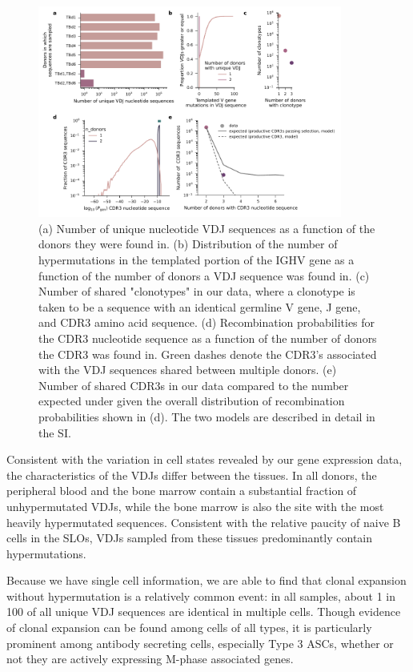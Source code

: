 \begin{figure}
    \centering
    \includegraphics[width=10cm]{figs/Tabula_Bursa/ED_donor_sharing.pdf}
    \caption[Characteristics of  VDJ sequences found in multiple donors.]{(a) Number of unique nucleotide VDJ sequences as a function of the donors they were found in. (b) Distribution of the number of hypermutations in the templated portion of the IGHV gene as a function of the number of donors a VDJ sequence was found in. (c) Number of shared "clonotypes" in our data, where a clonotype is taken to be a sequence with an identical germline V gene, J gene, and CDR3 amino acid sequence. (d) Recombination probabilities for the CDR3 nucleotide sequence as a function of the number of donors the CDR3 was found in. Green dashes denote the CDR3's associated with the VDJ sequences shared between multiple donors. (e) Number of shared CDR3s in our data compared to the number expected under given the overall distribution of recombination probabilities shown in (d). The two models are described in detail in the SI.}
    \label{ED:multidonor-vdjs}
\end{figure}

Consistent with the variation in cell states revealed by our gene expression data, the characteristics of the VDJs differ between the tissues. In all donors, the peripheral blood and the bone marrow contain a substantial fraction of unhypermutated VDJs, while the bone marrow is also the site with the most heavily hypermutated sequences. Consistent with the relative paucity of naive B cells in the SLOs, VDJs sampled from these tissues predominantly contain hypermutations. 

Because we have single cell information, we are able to find that clonal expansion without hypermutation is a relatively common event: in all samples, about 1 in 100 of all unique VDJ sequences are identical in multiple cells. Though evidence of clonal expansion can be found among cells of all types, it is particularly prominent among antibody secreting cells, especially Type 3 ASCs, whether or not they are actively expressing M-phase associated genes. 

